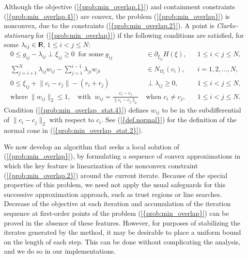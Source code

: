 \documentclass{siamltex}
\providecommand{\norm}[1]{\lVert#1\rVert}
\begin{document}
Although the objective {(\ref{{prob:min_overlap.1}})} and containment
constraints {(\ref{{prob:min_overlap.4}})} are convex, the problem
{(\ref{{prob:min_overlap}})} is nonconvex, due to the constraints
{(\ref{{prob:min_overlap.2}})}. A point is {\em Clarke-stationary} for
{(\ref{{prob:min_overlap}})} if the following conditions are satisfied,
for some $\lambda_{ij} \in {\makebox{\sf I \hspace{-8.5 pt} R \hspace{-4.0pt}}}$, $1 \le i < j \le N$:
\begin{subequations}
\label{prob:min_overlap_stat}
\begin{align}
\label{prob:min_overlap_stat.1}
0 \le g_{ij} - \lambda_{ij}  \perp \xi_{ij} \ge 0 \;\; \mbox{for some} \; g_{ij} 
& \in \partial_{\xi_{ij}} H(\xi), && 1 \le i < j \le N, 
\\
\label{prob:min_overlap_stat.2}
\sum_{j=i+1}^{N} \lambda_{ij} w_{ij} - 
\sum_{j=1}^{i-1} \lambda_{ji} w_{ji} & \in N_{\Omega_i}(c_i), && i=1,2,\dotsc,N,
\\
\label{prob:min_overlap_stat.3}
0 \le \xi_{ij} + \norm{c_i-c_j}-(r_i+r_j) & \perp \lambda_{ij} \ge 0, 
&& 1 \le i < j \le N, 
\\
\label{prob:min_overlap_stat.4}
\mbox{where} \; \norm{w_{ij}}_2 \le 1, \quad \mbox{with} \;\; 
w_{ij} = \frac{c_i-c_j}{\norm{c_i-c_j}_2} \; & \mbox{when $c_i \neq c_j$},
&& 1 \le i < j \le N.
\end{align}
\end{subequations}
Condition {(\ref{{prob:min_overlap_stat.4}})} defines $w_{ij}$ to be in 
the subdifferential of $\norm{c_i-c_j}_2$ with respect to $c_i$. See
{(\ref{{def.normal}})} for the definition of the normal cone in
{(\ref{{prob:min_overlap_stat.2}})}.

We now develop an algorithm that seeks a local solution of
{(\ref{{prob:min_overlap}})}, by formulating a sequence of convex
approximations in which the key feature is linearization of the
nonconvex constraint {(\ref{{prob:min_overlap.2}})} around the current
iterate. Because of the special properties of this problem, we need
not apply the usual safeguards for this successive approximation
approach, such as trust regions or line searches. Decrease of the
objective at each iteration and accumulation of the iteration sequence
at first-order points of the problem {(\ref{{prob:min_overlap}})} can be
proved in the absence of these features. However, for purposes of stabilizing
the iterates generated by the method, it may be desirable to place a
uniform bound on the length of each step. This can be done without
complicating the analysis, and we do so in our implementations. 
\end{document}
